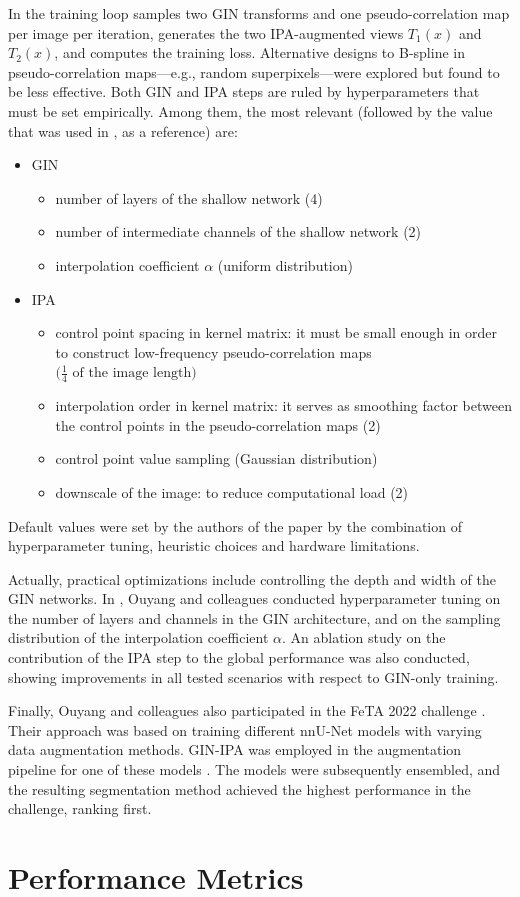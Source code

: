 In \cite{Ouyang2023} the training loop samples two GIN transforms and one pseudo-correlation map per image per iteration, generates the two IPA-augmented views $T_1(x)$ and $T_2(x)$, and computes the training loss. Alternative designs to B-spline in pseudo-correlation maps---e.g., random superpixels---were explored but found to be less effective. Both GIN and IPA steps are ruled by hyperparameters that must be set empirically. Among them, the most relevant (followed by the value that was used in \cite{Ouyang2023}, as a reference) are:
\begin{itemize}
    \item GIN
    \begin{itemize}
        \item number of layers of the shallow network (4)
        \item number of intermediate channels of the shallow network (2)
        \item interpolation coefficient $\alpha$ (uniform distribution)
    \end{itemize}
    \item IPA
    \begin{itemize}
        \item control point spacing in kernel matrix: it must be small enough in order to construct low-frequency pseudo-correlation maps $\bigl(\frac{1}{4}\textrm{ of the image length}\bigr)$
        \item interpolation order in kernel matrix: it serves as smoothing factor between the control points in the pseudo-correlation maps (2)
        \item control point value sampling (Gaussian distribution)
        \item downscale of the image: to reduce computational load (2)
    \end{itemize}
\end{itemize}
Default values were set by the authors of the paper by the combination of hyperparameter tuning, heuristic choices and hardware limitations.

Actually, practical optimizations include controlling the depth and width of the GIN networks. In \cite{Ouyang2023}, Ouyang and colleagues conducted hyperparameter tuning on the number of layers and channels in the GIN architecture, and on the sampling distribution of the interpolation coefficient $\alpha$. An ablation study on the contribution of the IPA step to the global performance was also conducted, showing improvements in all tested scenarios with respect to GIN-only training.

Finally, Ouyang and colleagues also participated in the FeTA 2022 challenge \cite{FeTA2022_review}. Their approach was based on training different nnU-Net models with varying data augmentation methods. GIN-IPA was employed in the augmentation pipeline for one of these models \cite{FeTA2022_top}. The models were subsequently ensembled, and the resulting segmentation method achieved the highest performance in the challenge, ranking first.

\section{Performance Metrics}
